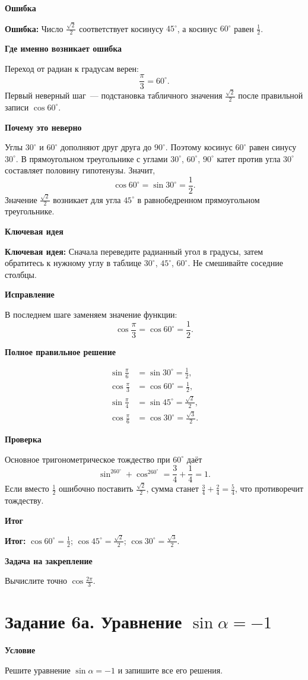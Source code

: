 \documentclass[a4paper,12pt]{article}
\newcommand{\rubric}[1]{\par\medskip\textbf{#1}\par\nobreak}
\newcommand{\err}[1]{\textcolor{errorred}{\textbf{Ошибка:}} #1}
\newcommand{\keyidea}[1]{\textcolor{accent}{\textbf{Ключевая идея:}} #1}
\newcommand{\outcome}[1]{\textcolor{accent}{\textbf{Итог:}} #1}
\begin{document}
\rubric{Ошибка}
\err{Число $\frac{\sqrt2}{2}$ соответствует косинусу $45^\circ$, а косинус $60^\circ$ равен $\frac12$.}

\rubric{Где именно возникает ошибка}
Переход от радиан к градусам верен:
\[\frac{\pi}{3}=60^\circ.\]
Первый неверный шаг~--- подстановка табличного значения $\frac{\sqrt2}{2}$ после правильной записи $\cos60^\circ$.

\rubric{Почему это неверно}
Углы $30^\circ$ и $60^\circ$ дополняют друг друга до $90^\circ$. Поэтому косинус $60^\circ$ равен синусу $30^\circ$. В прямоугольном треугольнике с углами $30^\circ$, $60^\circ$, $90^\circ$ катет против угла $30^\circ$ составляет половину гипотенузы. Значит,
\[\cos60^\circ=\sin30^\circ=\frac12.\]
Значение $\frac{\sqrt2}{2}$ возникает для угла $45^\circ$ в равнобедренном прямоугольном треугольнике.

\rubric{Ключевая идея}
\keyidea{Сначала переведите радианный угол в градусы, затем обратитесь к нужному углу в таблице $30^\circ$, $45^\circ$, $60^\circ$. Не смешивайте соседние столбцы.}

\rubric{Исправление}
В последнем шаге заменяем значение функции:
\[\cos\frac{\pi}{3}=\cos60^\circ=\boxed{\frac12}.\]

\rubric{Полное правильное решение}
\begin{align*}
\sin\frac{\pi}{6}&=\sin30^\circ=\frac12,\\
\cos\frac{\pi}{3}&=\cos60^\circ=\frac12,\\
\sin\frac{\pi}{4}&=\sin45^\circ=\frac{\sqrt2}{2},\\
\cos\frac{\pi}{6}&=\cos30^\circ=\frac{\sqrt3}{2}.
\end{align*}

\rubric{Проверка}
Основное тригонометрическое тождество при $60^\circ$ даёт
\[\sin^260^\circ+\cos^260^\circ
=\frac34+\frac14=1.\]
Если вместо $\frac12$ ошибочно поставить $\frac{\sqrt2}{2}$, сумма станет $\frac34+\frac24=\frac54$, что противоречит тождеству.

\rubric{Итог}
\outcome{$\cos60^\circ=\frac12$; $\cos45^\circ=\frac{\sqrt2}{2}$; $\cos30^\circ=\frac{\sqrt3}{2}$.}

\rubric{Задача на закрепление}
Вычислите точно $\displaystyle\cos\frac{2\pi}{3}$.

\clearpage
{}\label{task:6}
\section*{Задание 6а. Уравнение $\sin\alpha=-1$}
\rubric{Условие}
Решите уравнение $\sin\alpha=-1$ и запишите все его решения.
\end{document}
